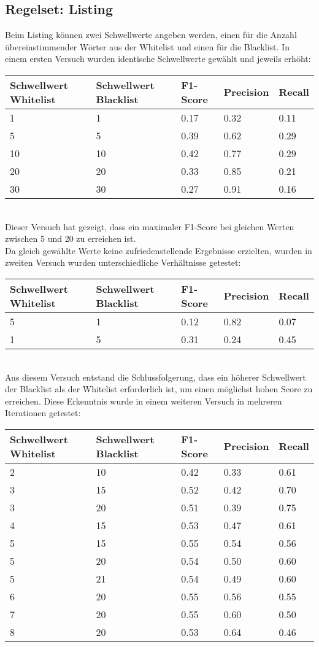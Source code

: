 \subsection{Regelset: Listing}
Beim Listing können zwei Schwellwerte angeben werden, einen für die Anzahl übereinstimmender Wörter aus der Whitelist und einen für die Blacklist.
In einem ersten Versuch wurden identische Schwellwerte gewählt und jeweils erhöht:\\
\begin{tabular}{|l|l|l|l|l|}
	\hline
	Schwellwert Whitelist & Schwellwert Blacklist & F1-Score & Precision & Recall\\
	\hline
	1 & 1 & 0.17 & 0.32 & 0.11 \\
	5 & 5 & 0.39 & 0.62 & 0.29 \\
	10 & 10 & 0.42 & 0.77 & 0.29 \\
	20 & 20 & 0.33 & 0.85 & 0.21 \\
	30 & 30 & 0.27 & 0.91 & 0.16 \\
	\hline
\end{tabular}\\
Dieser Versuch hat gezeigt, dass ein maximaler F1-Score bei gleichen Werten zwischen 5 und 20 zu erreichen ist.\\
Da gleich gewählte Werte keine zufriedenstellende Ergebnisse erzielten, wurden in zweiten Versuch wurden unterschiedliche Verhältnisse getestet:\\
\begin{tabular}{|l|l|l|l|l|}
	\hline
	Schwellwert Whitelist & Schwellwert Blacklist & F1-Score & Precision & Recall\\
	\hline
	5 & 1 & 0.12 & 0.82 & 0.07 \\
	1 & 5 & 0.31 & 0.24 & 0.45 \\
	\hline
\end{tabular}\\
Aus diesem Versuch entstand die Schlussfolgerung, dass ein höherer Schwellwert der Blacklist als der Whitelist erforderlich ist, um einen möglichst hohen Score zu erreichen.
Diese Erkenntnis wurde in einem weiteren Versuch in mehreren Iterationen getestet:\\
\begin{tabular}{|l|l|l|l|l|}
	\hline
	Schwellwert Whitelist & Schwellwert Blacklist & F1-Score & Precision & Recall\\
	\hline
	2 & 10 & 0.42 & 0.33 & 0.61 \\
	3 & 15 & 0.52 & 0.42 & 0.70 \\
	3 & 20 & 0.51 & 0.39 & 0.75 \\
	4 & 15 & 0.53 & 0.47 & 0.61 \\
	5 & 15 & 0.55 & 0.54 & 0.56 \\
	5 & 20 & 0.54 & 0.50 & 0.60 \\
	5 & 21 & 0.54 & 0.49 & 0.60 \\
	6 & 20 & 0.55 & 0.56 & 0.55 \\
	7 & 20 & 0.55 & 0.60 & 0.50 \\
	8 & 20 & 0.53 & 0.64 & 0.46 \\
	\hline
\end{tabular}\\
